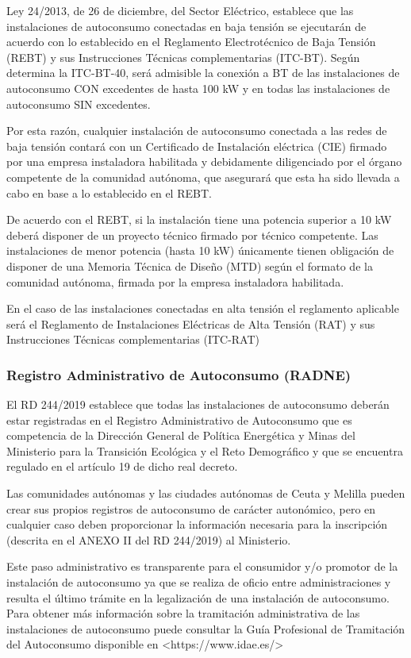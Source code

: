 \documentclass{article}
\begin{document}
Ley 24/2013, de 26 de diciembre, del Sector Eléctrico, establece que las instalaciones de autoconsumo conectadas en baja tensión se ejecutarán de acuerdo con lo establecido en el Reglamento Electrotécnico de Baja Tensión (REBT) y sus Instrucciones Técnicas complementarias (ITC-BT). Según determina la ITC-BT-40, será admisible la conexión a BT de las instalaciones de  autoconsumo CON excedentes de hasta 100 kW y en todas las instalaciones de autoconsumo SIN excedentes.

Por esta razón, cualquier instalación de autoconsumo conectada a las redes de baja tensión contará con un Certificado de Instalación eléctrica (CIE) firmado por una empresa instaladora habilitada y debidamente diligenciado por el órgano competente de la comunidad autónoma, que asegurará que esta ha sido llevada a cabo en base a lo establecido en el REBT.

De acuerdo con el REBT, si la instalación tiene una potencia superior a 10 kW deberá disponer de un proyecto técnico firmado por técnico competente. Las instalaciones de menor potencia (hasta 10 kW) únicamente tienen obligación de disponer de una Memoria Técnica de Diseño (MTD) según el formato de la comunidad autónoma, firmada por la empresa instaladora habilitada.

En el caso de las instalaciones conectadas en alta tensión el reglamento aplicable será el Reglamento de Instalaciones Eléctricas de Alta Tensión (RAT) y sus Instrucciones Técnicas complementarias (ITC-RAT)

\subsubsection{Registro Administrativo de Autoconsumo (RADNE)}

El RD 244/2019 establece que todas las instalaciones de autoconsumo deberán estar registradas en el Registro Administrativo de Autoconsumo que es competencia de la Dirección General de Política Energética y Minas del Ministerio para la Transición Ecológica y el Reto Demográfico y que se encuentra regulado en el artículo 19 de dicho real decreto.

Las comunidades autónomas y las ciudades autónomas de Ceuta y Melilla pueden crear sus propios registros de autoconsumo de carácter autonómico, pero en cualquier caso deben proporcionar la información necesaria para la inscripción (descrita en el ANEXO II del RD 244/2019) al Ministerio.

Este paso administrativo es transparente para el consumidor y/o promotor de la instalación de autoconsumo ya que se realiza de oficio entre administraciones y resulta el último trámite en la legalización de una instalación de autoconsumo. Para obtener más información sobre la tramitación administrativa de las instalaciones de autoconsumo puede consultar la Guía Profesional de Tramitación del Autoconsumo disponible en <https://www.idae.es/>
\end{document}
